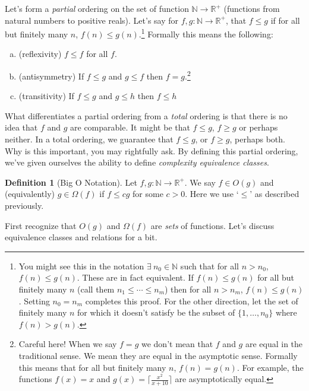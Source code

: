 \documentclass[11pt]{article}
\theoremstyle{plain}
\theoremstyle{definition}
\newtheorem{defn}[thm]{Definition} %
\newcommand{\NN}{\mathbb{N}}
\newcommand{\RR}{\mathbb{R}}
\numberwithin{equation}{section}
\numberwithin{figure}{section}
\begin{document}
\noindent Let's form a \emph{partial} ordering on the set of function $\NN \rightarrow \RR^+$ (functions from natural numbers to positive reals). Let's say for $f, g : \NN \rightarrow \RR^+$, that $f \leq g$ if for all but finitely many $n$, $f(n) \leq g(n)$.\footnote{You might see this in the notation $\exists \ n_0 \in \NN$ such that for all $n > n_0$, $f(n) \leq g(n)$. These are in fact equivalent. If $f(n) \leq g(n)$ for all but finitely many $n$ (call them $n_1 \leq \cdots \leq n_m$) then for all $n > n_m$, $f(n) \leq g(n)$. Setting $n_0 = n_m$ completes this proof. For the other direction, let the set of finitely many $n$ for which it doesn't satisfy be the subset of $\{1, \ldots, n_0\}$ where $f(n) > g(n)$.} Formally this means the following:
\begin{enumerate}[(a)]
\item (reflexivity) $f \leq f$ for all $f$.
\item (antisymmetry) If $f \leq g$ and $g \leq f$ then $f = g$.\footnote{Careful here! When we say $f = g$ we don't mean that $f$ and $g$ are equal in the traditional sense. We mean they are equal in the asymptotic sense. Formally this means that for all but finitely many $n$, $f(n) = g(n)$. For example, the functions $f(x) = x$ and $g(x) = \lceil \frac{x^2}{x + 10} \rceil$ are asymptotically equal.}
\item (transitivity) If $f \leq g$ and $g \leq h$ then $f \leq h$ 
\end{enumerate}
What differentiates a partial ordering from a \emph{total} ordering is that there is no idea that $f$ and $g$ are comparable. It might be that $f \leq g$, $f \geq g$ or perhaps neither. In a total ordering, we guarantee that $f \leq g$, or $f \geq g$, perhaps both. \\

\noindent Why is this important, you may rightfully ask. By defining this partial ordering, we've given ourselves the ability to define \emph{complexity equivalence classes}. 

\begin{framed}
\begin{defn}[Big O Notation]
Let $f, g : \NN \rightarrow \RR^+$. We say $f \in O(g)$ and (equivalently) $g \in \Omega(f)$ if $f \leq c g$ for some $c > 0$. Here we use `$\leq$' as described previously.
\end{defn}
\end{framed}

\noindent First recognize that $O(g)$ and $\Omega(f)$ are \emph{sets} of functions. Let's discuss equivalence classes and relations for a bit.
\end{document}
